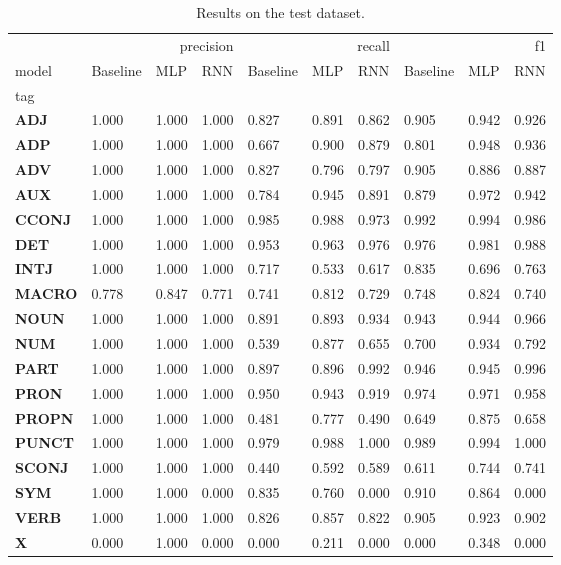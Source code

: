 \begin{table}
\caption{Results on the test dataset.}
\label{tab::ex_2_test}
\begin{tabular}{|l||l||l||l||l||l||l||l||l||l|}
\toprule
 & \multicolumn{3}{r}{precision} & \multicolumn{3}{r}{recall} & \multicolumn{3}{r}{f1} \\
model & Baseline & MLP & RNN & Baseline & MLP & RNN & Baseline & MLP & RNN \\
tag &  &  &  &  &  &  &  &  &  \\
\midrule
\textbf{ADJ} & 1.000 & 1.000 & 1.000 & 0.827 & 0.891 & 0.862 & 0.905 & 0.942 & 0.926 \\
\textbf{ADP} & 1.000 & 1.000 & 1.000 & 0.667 & 0.900 & 0.879 & 0.801 & 0.948 & 0.936 \\
\textbf{ADV} & 1.000 & 1.000 & 1.000 & 0.827 & 0.796 & 0.797 & 0.905 & 0.886 & 0.887 \\
\textbf{AUX} & 1.000 & 1.000 & 1.000 & 0.784 & 0.945 & 0.891 & 0.879 & 0.972 & 0.942 \\
\textbf{CCONJ} & 1.000 & 1.000 & 1.000 & 0.985 & 0.988 & 0.973 & 0.992 & 0.994 & 0.986 \\
\textbf{DET} & 1.000 & 1.000 & 1.000 & 0.953 & 0.963 & 0.976 & 0.976 & 0.981 & 0.988 \\
\textbf{INTJ} & 1.000 & 1.000 & 1.000 & 0.717 & 0.533 & 0.617 & 0.835 & 0.696 & 0.763 \\
\textbf{MACRO} & 0.778 & 0.847 & 0.771 & 0.741 & 0.812 & 0.729 & 0.748 & 0.824 & 0.740 \\
\textbf{NOUN} & 1.000 & 1.000 & 1.000 & 0.891 & 0.893 & 0.934 & 0.943 & 0.944 & 0.966 \\
\textbf{NUM} & 1.000 & 1.000 & 1.000 & 0.539 & 0.877 & 0.655 & 0.700 & 0.934 & 0.792 \\
\textbf{PART} & 1.000 & 1.000 & 1.000 & 0.897 & 0.896 & 0.992 & 0.946 & 0.945 & 0.996 \\
\textbf{PRON} & 1.000 & 1.000 & 1.000 & 0.950 & 0.943 & 0.919 & 0.974 & 0.971 & 0.958 \\
\textbf{PROPN} & 1.000 & 1.000 & 1.000 & 0.481 & 0.777 & 0.490 & 0.649 & 0.875 & 0.658 \\
\textbf{PUNCT} & 1.000 & 1.000 & 1.000 & 0.979 & 0.988 & 1.000 & 0.989 & 0.994 & 1.000 \\
\textbf{SCONJ} & 1.000 & 1.000 & 1.000 & 0.440 & 0.592 & 0.589 & 0.611 & 0.744 & 0.741 \\
\textbf{SYM} & 1.000 & 1.000 & 0.000 & 0.835 & 0.760 & 0.000 & 0.910 & 0.864 & 0.000 \\
\textbf{VERB} & 1.000 & 1.000 & 1.000 & 0.826 & 0.857 & 0.822 & 0.905 & 0.923 & 0.902 \\
\textbf{X} & 0.000 & 1.000 & 0.000 & 0.000 & 0.211 & 0.000 & 0.000 & 0.348 & 0.000 \\
\bottomrule
\end{tabular}
\end{table}
